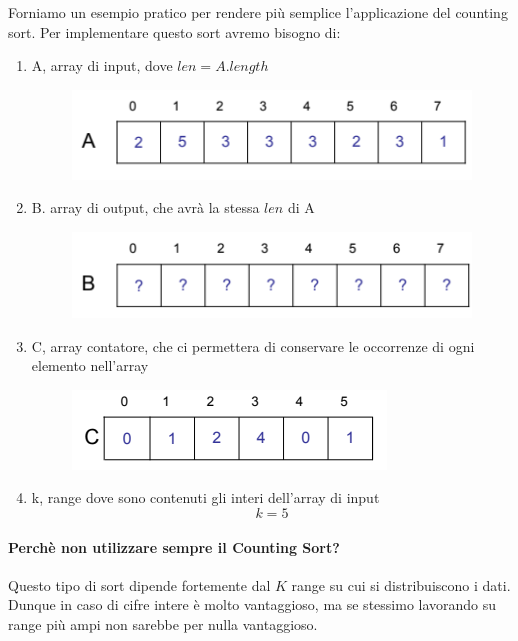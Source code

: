 \documentclass{article}
\begin{document}
Forniamo un esempio pratico per rendere più semplice l'applicazione del counting sort. Per implementare questo sort avremo bisogno di:

\begin{enumerate}
    \item A, array di input, dove $len=A.length$
    \begin{figure}[htbp]
        \center
        \includegraphics[scale=0.6]{img/countingSort1.png}
    \end{figure}
    \item B. array di output, che avrà la stessa $len$ di A
    \begin{figure}[htbp]
        \center
        \includegraphics[scale=0.6]{img/countingSort2.png}
    \end{figure}
    \item C, array contatore, che ci permettera di conservare le occorrenze di ogni elemento nell'array
    \begin{figure}[htbp]
        \center
        \includegraphics[scale=0.6]{img/countingSort3.png}
    \end{figure}
    \item k, range dove sono contenuti gli interi dell'array di input
    \begin{equation}
        k=5
    \end{equation}
\end{enumerate}

\paragraph{Perchè non utilizzare sempre il Counting Sort?} Questo tipo di sort dipende fortemente dal $K$ range su cui si distribuiscono i dati. Dunque in caso di cifre intere è molto vantaggioso, ma se stessimo lavorando su range più ampi non sarebbe per nulla vantaggioso.
\end{document}
